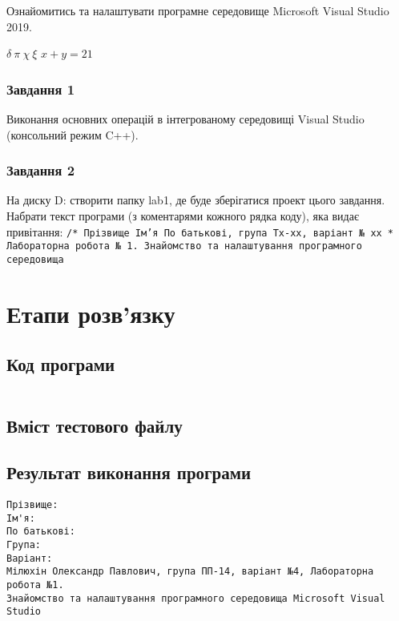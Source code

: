 \documentclass[a4paper, 12pt, oneside]{extarticle}
\begin{document}
\Margins



Ознайомитись та налаштувати програмне середовище Microsoft Visual
Studio 2019.

$\delta~\pi~\chi~\xi$
$x + y = 21$

\subsubsection*{Завдання 1}

Виконання основних операцій в інтегрованому середовищі Visual Studio
(консольний режим C++).

\subsubsection*{Завдання 2}

На диску D: створити папку lab1, де буде зберігатися проект цього завдання.
Набрати текст програми (з коментарями кожного рядка коду), яка видає
привітання:
\texttt{/* Прізвище Ім’я По батькові, група Тх-хх, варіант № хх * Лабораторна
робота № 1. Знайомство та налаштування програмного середовища}

\section*{Етапи розв'язку}

\subsection*{Код програми}



\inputminted{c++}{1.cpp}

\subsection*{Вміст тестового файлу}


\subsection*{Результат виконання програми}

\begin{verbatim}
Прізвище:
Ім'я:
По батькові:
Група:
Варіант:
Мілюхін Олександр Павлович, група ПП-14, варіант №4, Лабораторна робота №1.
Знайомство та налаштування програмного середовища Microsoft Visual Studio
\end{verbatim}
\end{document}
